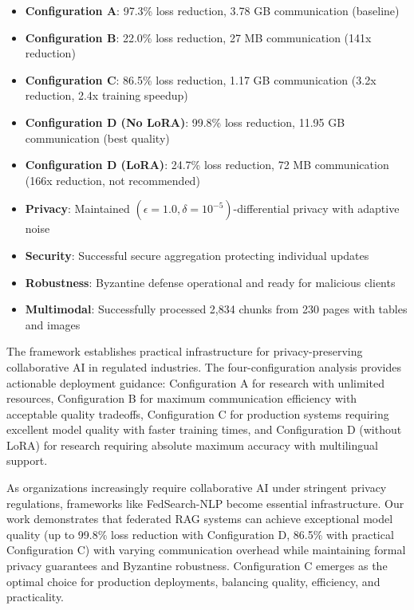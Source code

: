 \documentclass[conference]{IEEEtran}
\begin{document}
\begin{itemize}
    \item \textbf{Configuration A}: 97.3\% loss reduction, 3.78 GB communication (baseline)
    \item \textbf{Configuration B}: 22.0\% loss reduction, 27 MB communication (141x reduction)
    \item \textbf{Configuration C}: 86.5\% loss reduction, 1.17 GB communication (3.2x reduction, 2.4x training speedup)
    \item \textbf{Configuration D (No LoRA)}: 99.8\% loss reduction, 11.95 GB communication (best quality)
    \item \textbf{Configuration D (LoRA)}: 24.7\% loss reduction, 72 MB communication (166x reduction, not recommended)
    \item \textbf{Privacy}: Maintained $(\epsilon=1.0, \delta=10^{-5})$-differential privacy with adaptive noise
    \item \textbf{Security}: Successful secure aggregation protecting individual updates
    \item \textbf{Robustness}: Byzantine defense operational and ready for malicious clients
    \item \textbf{Multimodal}: Successfully processed 2,834 chunks from 230 pages with tables and images
\end{itemize}

The framework establishes practical infrastructure for privacy-preserving collaborative AI in regulated industries. The four-configuration analysis provides actionable deployment guidance: Configuration A for research with unlimited resources, Configuration B for maximum communication efficiency with acceptable quality tradeoffs, Configuration C for production systems requiring excellent model quality with faster training times, and Configuration D (without LoRA) for research requiring absolute maximum accuracy with multilingual support.

As organizations increasingly require collaborative AI under stringent privacy regulations, frameworks like FedSearch-NLP become essential infrastructure. Our work demonstrates that federated RAG systems can achieve exceptional model quality (up to 99.8\% loss reduction with Configuration D, 86.5\% with practical Configuration C) with varying communication overhead while maintaining formal privacy guarantees and Byzantine robustness. Configuration C emerges as the optimal choice for production deployments, balancing quality, efficiency, and practicality.
\end{document}

